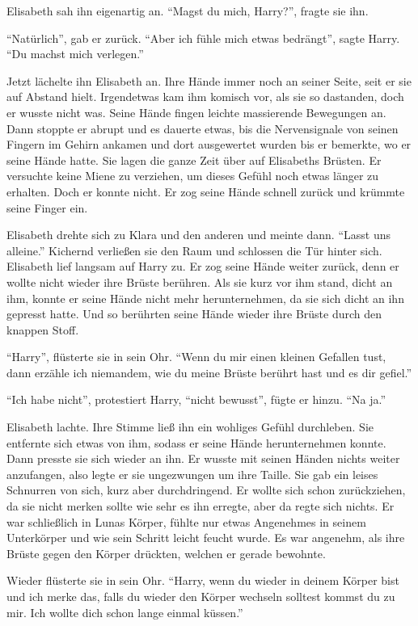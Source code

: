 Elisabeth sah ihn eigenartig an. \enquote{Magst du mich, Harry?}, fragte sie ihn.

\enquote{Natürlich}, gab er zurück. \enquote{Aber ich fühle mich etwas bedrängt}, sagte Harry. \enquote{Du machst mich verlegen.}

Jetzt lächelte ihn Elisabeth an. Ihre Hände immer noch an seiner Seite, seit er sie auf Abstand hielt. Irgendetwas kam ihm komisch vor, als sie so dastanden, doch er wusste nicht was. Seine Hände fingen leichte massierende Bewegungen an. Dann stoppte er abrupt und es dauerte etwas, bis die Nervensignale von seinen Fingern im Gehirn ankamen und dort ausgewertet wurden \gst bis er bemerkte, wo er seine Hände hatte. Sie lagen die ganze Zeit über auf Elisabeths Brüsten. Er versuchte keine Miene zu verziehen, um dieses Gefühl noch etwas länger zu erhalten. Doch er konnte nicht. Er zog seine Hände schnell zurück und krümmte seine Finger ein.

Elisabeth drehte sich zu Klara und den anderen und meinte dann. \enquote{Lasst uns alleine.} Kichernd verließen sie den Raum und schlossen die Tür hinter sich. Elisabeth lief langsam auf Harry zu. Er zog seine Hände weiter zurück, denn er wollte nicht wieder ihre Brüste berühren. Als sie kurz vor ihm stand, dicht an ihm, konnte er seine Hände nicht mehr herunternehmen, da sie sich dicht an ihn gepresst hatte. Und so berührten seine Hände wieder ihre Brüste durch den knappen Stoff.

\enquote{Harry}, flüsterte sie in sein Ohr. \enquote{Wenn du mir einen kleinen Gefallen tust, dann erzähle ich niemandem, wie du meine Brüste berührt hast und es dir gefiel.}

\enquote{Ich habe nicht}, protestiert Harry, \enquote{nicht bewusst}, fügte er hinzu. \enquote{Na ja.}

Elisabeth lachte. Ihre Stimme ließ ihn ein wohliges Gefühl durchleben. Sie entfernte sich etwas von ihm, sodass er seine Hände herunternehmen konnte. Dann presste sie sich wieder an ihn. Er wusste mit seinen Händen nichts weiter anzufangen, also legte er sie ungezwungen um ihre Taille. Sie gab ein leises Schnurren von sich, kurz aber durchdringend. Er wollte sich schon zurückziehen, da sie nicht merken sollte wie sehr es ihn erregte, aber da regte sich nichts. Er war schließlich in Lunas Körper, fühlte nur etwas Angenehmes in seinem Unterkörper und wie sein Schritt leicht feucht wurde. Es war angenehm, als ihre Brüste gegen den Körper drückten, welchen er gerade bewohnte.

Wieder flüsterte sie in sein Ohr. \enquote{Harry, wenn du wieder in deinem Körper bist \gst und ich merke das, falls du wieder den Körper wechseln solltest \gst kommst du zu mir. Ich wollte dich schon lange einmal küssen.}

